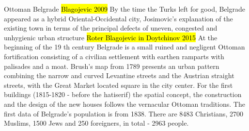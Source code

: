 \documentclass[11pt]{report}
\begin{document}
Ottoman Belgrade
	\hl{Blagojevic 2009} 
By the time the Turks left for good, Belgrade appeared as a hybrid Oriental-Occidental city,
Josimovic's explanation of the existing town in terms of the  principal  defects  of  uneven,  congested  and  unhygienic urban structure 
	\hl{Roter Blagojevic in Doytchinov 2015}
At the beginning of the 19 th  century Belgrade is a small ruined and negligent Ottoman fortification consisting of a civilian settlement with earthen ramparts with  palisades  and  a  moat.
Brush’s map from 1789 presents an urban pattern combining the narrow and curved Levantine streets and the Austrian straight streets, with the Great Market located square in the city center.
For the first buildings (1815-1820 - before the hatiserif) the spatial concept, the construction 
and the design of the new houses follows the vernacular Ottoman traditions.
The first data of Belgrade’s population is from 1838. There are 8483 Christians, 2700 Muslims, 1500 Jews and 250 foreigners, in total - 2963 people.
\end{document}
